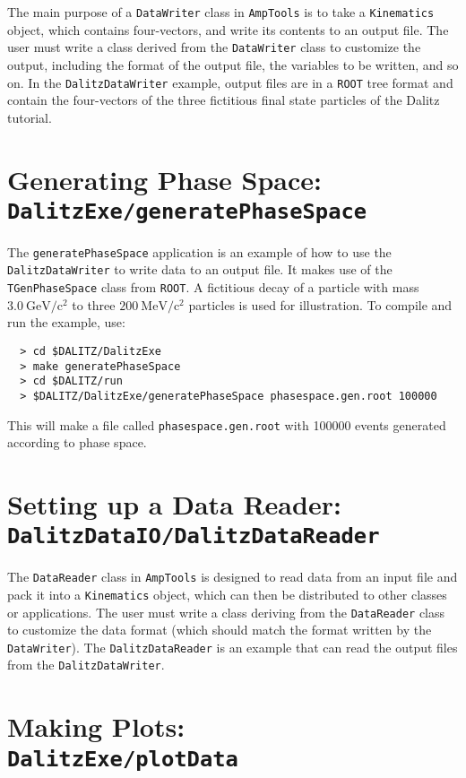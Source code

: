 \documentclass[11pt]{article}
\newcommand{\gevcc}{\mathrm{GeV/c^2}}
\newcommand{\mevcc}{\mathrm{MeV/c^2}}
\begin{document}
The main purpose of a {\tt DataWriter} class in {\tt AmpTools} is to take a {\tt Kinematics} object, which contains four-vectors, and write its contents to an output file.  The user must write a class derived from the {\tt DataWriter} class to customize the output, including the format of the output file, the variables to be written, and so on.  In the {\tt DalitzDataWriter} example, output files are in a {\tt ROOT} tree format and contain the four-vectors of the three fictitious final state particles of the Dalitz tutorial.

\section{Generating Phase Space: \\  
{\tt DalitzExe/generatePhaseSpace}}
\label{sec:ps}

The {\tt generatePhaseSpace} application is an example of how to use the {\tt DalitzDataWriter} to write data to an output file.  It makes use of the {\tt TGenPhaseSpace} class from {\tt ROOT}.  A fictitious decay of a particle with mass $3.0~\gevcc$ to three $200~\mevcc$ particles is used for illustration.  To compile and run the example, use:
\begin{verbatim}
  > cd $DALITZ/DalitzExe
  > make generatePhaseSpace
  > cd $DALITZ/run
  > $DALITZ/DalitzExe/generatePhaseSpace phasespace.gen.root 100000
\end{verbatim}
This will make a file called {\tt phasespace.gen.root} with 100000 events generated according to phase space.

\section{Setting up a Data Reader: \\
{\tt DalitzDataIO/DalitzDataReader}}
\label{sec:dr}

The {\tt DataReader} class in {\tt AmpTools} is designed to read data from an input file and pack it into a {\tt Kinematics} object, which can then be distributed to other classes or applications.  The user must write a class deriving from the {\tt DataReader} class to customize the data format (which should match the format written by the {\tt DataWriter}).  The {\tt DalitzDataReader} is an example that can read the output files from the {\tt DalitzDataWriter}.

\section{Making Plots: \\
{\tt DalitzExe/plotData}}
\label{sec:plot}
\end{document}
